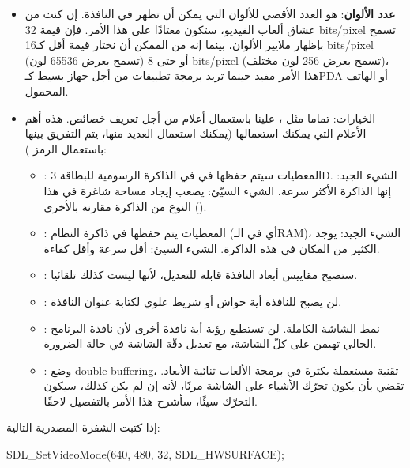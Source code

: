 \begin{itemize}
	\item \textbf{عدد الألوان}: 
	هو العدد الأقصى للألوان التي يمكن أن تظهر في النافذة. إن كنت من عشاق ألعاب الفيديو، ستكون معتادًا على هذا الأمر. فإن قيمة 
	\textenglish{32 bits/pixel}
	تسمح بإظهار ملايير الألوان، بينما إنه من الممكن أن نختار قيمة أقل كـ\textenglish{16 bits/pixel}
	(تسمح بعرض 65536 لون) أو حتى 
	\textenglish{8 bits/pixel}
	(تسمح بعرض 256 لون مختلف)، هذا الأمر مفيد حينما تريد برمجة تطبيقات من أجل جهاز بسيط كـ\textenglish{PDA}
	أو الهاتف المحمول.
	\item الخيارات: تماما مثل ،
	علينا باستعمال أعلام من أجل تعريف خصائص. هذه أهم الأعلام التي يمكنك استعمالها (يمكنك استعمال العديد منها، يتم التفريق بينها باستعمال الرمز
	\InlineCode{|}):
	\begin{itemize}
		\item {}:
المعطيات سيتم حفظها في في الذاكرة الرسومية للبطاقة
\textenglish{3D}.
الشيء الجيد: إنها الذاكرة الأكثر سرعة. الشيء السيّئ: يصعب إيجاد مساحة شاغرة في هذا النوع من الذاكرة مقارنة بالأخرى 
().
		\item {}:
المعطيات يتم حفظها في ذاكرة النظام (أي في الـ\textenglish{RAM})،
الشيء الجيد: يوجد الكثير من المكان في هذه الذاكرة. الشيء السيئ: أقل سرعة وأقل كفاءة.
		\item {}:
		ستصبح مقاييس أبعاد النافذة قابلة للتعديل، لأنها ليست كذلك تلقائيا.
		\item {}:
		لن يصبح للنافذة أية حواش أو شريط علوي لكتابة عنوان النافذة.
		\item {}:
		نمط الشاشة الكاملة. لن تستطيع رؤية أية نافذة أخرى لأن نافذة البرنامج الحالي تهيمن على كلّ الشاشة، مع تعديل دقّة الشاشة في حالة الضرورة.
		\item {}: وضع 
		\textenglish{double buffering}،
		تقنية مستعملة بكثرة في برمجة الألعاب ثنائية الأبعاد. تقضي بأن يكون تحرّك الأشياء على الشاشة مرنًا، لأنه إن لم يكن كذلك، سيكون التحرّك سيئًا، سأشرح هذا الأمر بالتفصيل لاحقًا.
	\end{itemize}
\end{itemize}

إذا كتبت الشفرة المصدرية التالية:

\begin{Csource}
SDL_SetVideoMode(640, 480, 32, SDL_HWSURFACE);
\end{Csource}

